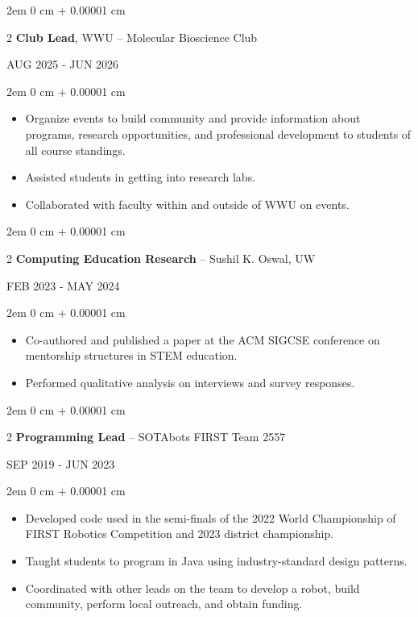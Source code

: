 \documentclass[11pt]{article}
\newcommand{\experience}[2]{%
  \begin{twocolentry}{\MakeUppercase{#2}}%
    {\fontsize{11.5pt}{13.5pt}\selectfont #1}%
  \end{twocolentry}%
}
\newenvironment{highlights}{
    \begin{itemize}[
        topsep=0.10 cm,
        parsep=0.10 cm,
        partopsep=0pt,
        itemsep=0pt,
        leftmargin=0 cm + 10pt
    ]
}{
    \end{itemize}
} %
\newenvironment{onecolentry}{
    \begin{adjustwidth}{
        2em
    }{
        0 cm + 0.00001 cm
    }
}{
    \end{adjustwidth}
} %
\newenvironment{twocolentry}[2][]{
    \onecolentry
    \def\secondColumn{#2}
    \setcolumnwidth{\fill, 5.5 cm}
    \begin{paracol}{2}
}{
    \switchcolumn \raggedleft \secondColumn
    \end{paracol}
    \endonecolentry
} %
\begin{document}
\experience{\textbf{Club Lead}, WWU -- 	Molecular Bioscience Club}{Aug 2025 - Jun 2026}
\begin{onecolentry}
	\begin{highlights}
		\item Organize events to build community and provide information about programs, research opportunities, and professional development to students of all course standings.
		\item Assisted students in getting into research labs.
		\item Collaborated with faculty within and outside of WWU on events.

	\end{highlights}
\end{onecolentry}

\experience{\textbf{Computing Education Research} -- Sushil K. Oswal, UW}{Feb 2023 - May 2024}
\begin{onecolentry}
	\begin{highlights}
		\item Co-authored and published a paper at the ACM SIGCSE conference on mentorship structures in STEM education.
		\item Performed qualitative analysis on interviews and survey responses.
	\end{highlights}
\end{onecolentry}
\experience{\textbf{Programming Lead} -- SOTAbots FIRST Team 2557}{Sep 2019 - Jun 2023}
\begin{onecolentry}
	\begin{highlights}
		\item Developed code used in the semi-finals of the 2022 World Championship of FIRST Robotics Competition and 2023 district championship.
		\item Taught students to program in Java using industry-standard design patterns.
		\item Coordinated with other leads on the team to develop a robot, build community, perform local outreach, and obtain funding.

	\end{highlights}
\end{onecolentry}
\end{document}
